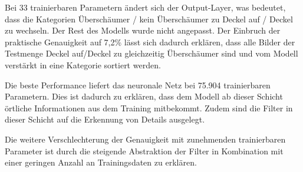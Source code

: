 Bei 33 trainierbaren Parametern ändert sich der Output-Layer, was bedeutet, dass die
Kategorien Überschäumer / kein Überschäumer zu Deckel auf / Deckel zu wechseln. Der
Rest des Modells wurde nicht angepasst. Der Einbruch der praktische Genauigkeit auf
7,2\% lässt sich dadurch erklären, dass alle Bilder der Testmenge Deckel auf/Deckel zu
gleichzeitig Überschäumer sind und vom Modell verstärkt in eine Kategorie sortiert werden.

Die beste Performance liefert das neuronale Netz bei 75.904 trainierbaren Parametern.
Dies ist dadurch zu erklären, dass dem Modell ab dieser Schicht örtliche Informationen
aus dem Training mitbekommt. Zudem sind die Filter in dieser Schicht auf die Erkennung
von Details ausgelegt.

Die weitere Verschlechterung der Genauigkeit mit zunehmenden trainierbaren Parameter
ist durch die steigende Abstraktion der Filter in Kombination mit einer geringen Anzahl
an Trainingsdaten zu erklären.

